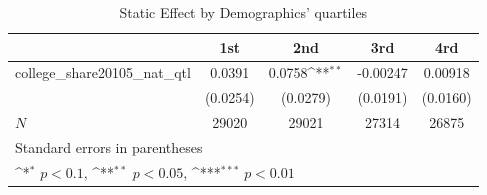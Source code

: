 \begin{table}[htbp]\centering
\def\sym#1{\ifmmode^{#1}\else\(^{#1}\)\fi}
\caption{Static Effect by Demographics' quartiles}
\begin{tabular}{l*{4}{c}}
\hline\hline
            &\multicolumn{1}{c}{1st}&\multicolumn{1}{c}{2nd}&\multicolumn{1}{c}{3rd}&\multicolumn{1}{c}{4rd}\\
\hline
college\_share20105\_nat\_qtl&      0.0391         &      0.0758\sym{**} &    -0.00247         &     0.00918         \\
            &    (0.0254)         &    (0.0279)         &    (0.0191)         &    (0.0160)         \\
\hline
\(N\)       &       29020         &       29021         &       27314         &       26875         \\
\hline\hline
\multicolumn{5}{l}{\footnotesize Standard errors in parentheses}\\
\multicolumn{5}{l}{\footnotesize \sym{*} \(p<0.1\), \sym{**} \(p<0.05\), \sym{***} \(p<0.01\)}\\
\end{tabular}
\end{table}
